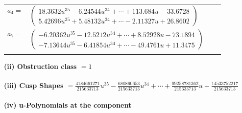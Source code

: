 \documentclass[1p]{elsarticle_modified}
\theoremstyle{definition}
\begin{document}
\begin{tabular}{m{7pt} m{180pt} m{7pt} m{180pt} }
\flushright $a_{4}=$&$\begin{pmatrix}18.3632 u^{35}-6.24544 u^{34}+\cdots+113.684 u-33.6728\\5.42696 u^{35}+5.48132 u^{34}+\cdots-2.11327 u+26.8602\end{pmatrix}$ \\
\flushright $a_{7}=$&$\begin{pmatrix}-6.20362 u^{35}-12.5212 u^{34}+\cdots+8.52928 u-73.1894\\-7.13644 u^{35}-6.41854 u^{34}+\cdots-49.4761 u+11.3475\end{pmatrix}$\\&\end{tabular}
\flushleft \textbf{(ii) Obstruction class $= 1$}\\~\\
\flushleft \textbf{(iii) Cusp Shapes $= \frac{4184661271}{215633713} u^{35}-\frac{680860653}{215633713} u^{34}+\cdots+\frac{99258781362}{215633713} u+\frac{14533752217}{215633713}$}\\~\\
\newpage\renewcommand{\arraystretch}{1}
\flushleft \textbf{(iv) u-Polynomials at the component}\newline \\
\end{document}
